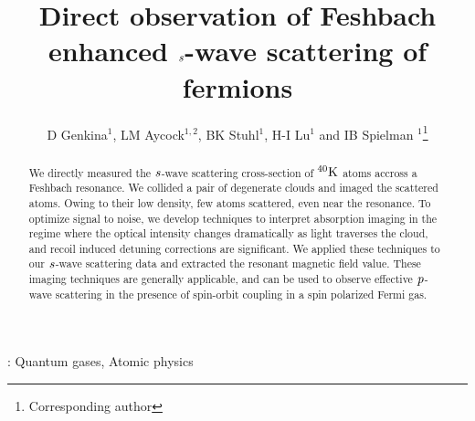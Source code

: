 \documentclass[12pt]{iopart}
\begin{document}
\newcommand{\swave}[0]{$\it{s}$-wave }
\newcommand{\pwave}[0]{$\it{p}$-wave }
\newcommand{\K}{ $^{40}\rm{K}$}
\newcommand{\Rb}{ $^{87}\rm{Rb}$}
\newcommand{\us}{$\mu \rm{s}$} 
\newcommand{\mT}{$m\rm{T}$}

\title[]{Direct observation of Feshbach enhanced \swave scattering of fermions}

\author{D Genkina$^1$, LM Aycock$^{1,2}$, BK Stuhl$^1$, H-I Lu$^1$ and IB Spielman
$^1$\footnote{Corresponding author}}

\address{$^1$Joint Quantum Institute, National Institute of Standards and Technology, and University of Maryland, Gaithersburg, MD, 20899 USA}
\address{$^2$Physics Department, Cornell University, Ithaca, NY 14850 USA}


\begin{abstract}
We directly measured the \swave{} scattering cross-section of \K{} atoms accross a Feshbach resonance. We collided a pair of degenerate clouds and imaged the scattered atoms. Owing to their low density, few atoms scattered, even near the resonance. To optimize signal to noise, we develop techniques to interpret absorption imaging in the regime where the optical intensity changes dramatically as light traverses the cloud, and recoil induced 
detuning corrections are significant. We applied these techniques to our \swave{} scattering data and extracted the resonant magnetic
field value. These imaging techniques are generally applicable, and can be used to observe effective \pwave{} scattering in the presence of spin-orbit coupling in a spin polarized  Fermi gas.

\end{abstract}

\vspace{2pc}
: Quantum gases, Atomic physics

\maketitle
\end{document}
